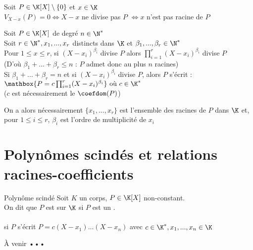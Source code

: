 \documentclass[12pt,a4paper]{report}
\begin{document}
\begin{remarque}
Soit $P \in \K[X] \setminus \lbrace 0 \rbrace$ et $x \in \K$\\
$V_{X-x} (P) = 0 \Longleftrightarrow X-x$ ne divise pas $P$ $\Longleftrightarrow x$ n'est pas racine de $P$
\end{remarque}

\begin{theoreme}{}{}
Soit $P \in \K[X]$ de degré $n\in \N^*$\\
Soit $r\in \N^*, x_1 , ..., x_r$ distincts dans $\K$ et $\beta_1 , ..., \beta_r \in \N^*$\\
Pour $1 \leq x \leq r$, si $(X-x_i)^{\beta_i}$ divise $P$ alors $\displaystyle \prod^r_{i=1} (X-x_i)^{\beta_i}$ divise $P$ \\
(D'où $\beta_1 + ...+ \beta_r \leq n$ : $P$ admet donc au plus $n$ racines)\\
Si $\beta_1 + ...+ \beta_r = n$ et si $(X-x_i)^{\beta_i}$ divise $P$, alors $P$ s'écrit : $\mathbox{P=c\prod^r_{i=1} (X-x_i)^{\beta_i}} \text{ où } c \in \K^*$\\
($c$ est nécessairement le $\coefdom(P)$)
\end{theoreme}

\begin{demo}

\end{demo}

\begin{remarque}
On a alors nécessairement $\lbrace x_1 , ..., x_r \rbrace$ est l'ensemble des racines de $P$ dans $\K$ et, pour $1 \leq i \leq r$, $\beta_i$ est l'ordre de multiplicité de $x_i$
\end{remarque}


\section{Polynômes scindés et relations racines-coefficients}

\begin{definition}{}{Polynôme scindé}
Soit $K$ un corps, $P\in\K[X]$ non-constant.\\
On dit que $P$ est  sur $\K$ si $P$ est un . \\
\\
\ie si $P$ s'écrit $P=c(X-x_1)...(X-x_n)$ avec $c\in \K^*, x_1 ,..., x_n \in \K$
\end{definition}

\begin{remarque}
À venir ••• \\ 
\end{remarque}
\end{document}
